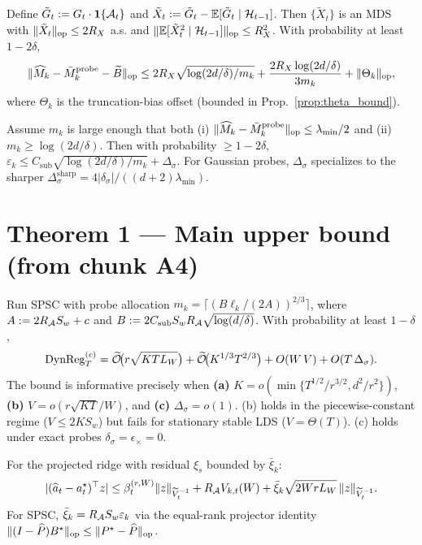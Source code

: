 \begin{theorem}
\label{thm:matrix_bernstein}
Define $\tilde G_t := G_t\cdot\mathbf 1\{\mathcal{A}_t\}$ and
$\tilde X_t := \tilde G_t - \mathbb{E}[\tilde G_t\mid\mathcal{H}_{t-1}]$.
Then $\{\tilde X_t\}$ is an MDS with $\|\tilde X_t\|_{\mathrm{op}}\le 2R_X$ a.s.
and $\|\mathbb{E}[\tilde X_t^2\mid\mathcal{H}_{t-1}]\|_{\mathrm{op}}\le R_X^2$. With probability
at least $1-2\delta$,
\[
\|\widehat M_k - \bar M_k^{\mathrm{probe}} - \widetilde B\|_{\mathrm{op}}
\le 2R_X\sqrt{\log(2d/\delta)/m_k} + \frac{2R_X\log(2d/\delta)}{3m_k}
+ \|\Theta_k\|_{\mathrm{op}},
\]
where $\Theta_k$ is the truncation-bias offset
(bounded in Prop.\ \ref{prop:theta_bound}).
\end{theorem}

\begin{corollary}
\label{cor:projector}
Assume $m_k$ is large enough that both (i)
$\|\widehat M_k - \bar M_k^{\mathrm{probe}}\|_{\mathrm{op}}\le\lambda_{\min}/2$
and (ii) $m_k\ge\log(2d/\delta)$. Then with probability $\ge 1-2\delta$,
$\varepsilon_k \le C_{\mathrm{sub}}\sqrt{\log(2d/\delta)/m_k} + \Delta_\sigma$.
For Gaussian probes, $\Delta_\sigma$ specializes to the sharper
$\Delta_\sigma^{\mathrm{sharp}} = 4|\delta_\sigma|/((d+2)\lambda_{\min})$.
\end{corollary}

\section{Theorem 1 --- Main upper bound (from chunk A4)}

\begin{theorem}
\label{thm:spsc_regret}
Run SPSC with probe allocation $m_k = \lceil (B\ell_k/(2A))^{2/3}\rceil$,
where $A := 2R_{\mathcal{A}} S_w + c$ and
$B := 2 C_{\mathrm{sub}} S_w R_{\mathcal{A}} \sqrt{\log(d/\delta)}$.
With probability at least $1-\delta$,
\[
\mathrm{DynReg}_T^{(c)}
= \widetilde{\mathcal{O}}\!\bigl(r\sqrt{K T L_W}\bigr)
+ \widetilde{\mathcal{O}}\!\bigl(K^{1/3}T^{2/3}\bigr)
+ O(W\,V)
+ O(T\,\Delta_\sigma).
\]
The bound is informative precisely when
\textbf{(a)} $K=o(\min\{T^{1/2}/r^{3/2},d^2/r^2\})$,
\textbf{(b)} $V=o(r\sqrt{KT}/W)$, and
\textbf{(c)} $\Delta_\sigma = o(1)$.
(b) holds in the piecewise-constant regime ($V\le 2KS_w$) but fails
for stationary stable LDS ($V=\Theta(T)$). (c) holds under exact
probes $\delta_\sigma=\epsilon_\times=0$.
\end{theorem}

\begin{lemma}
\label{lem:drift}
For the projected ridge with residual $\xi_s$ bounded by $\bar\xi_k$:
\[
|(\widehat a_t - a_t^\star)^\top z|
\le \beta_t^{(r,W)}\|z\|_{\widetilde V_t^{-1}}
+ R_{\mathcal{A}} V_{k,t}(W)
+ \bar\xi_k\sqrt{2W r L_W}\,\|z\|_{\widetilde V_t^{-1}}.
\]
For SPSC, $\bar\xi_k=R_{\mathcal{A}} S_w\varepsilon_k$ via the equal-rank
projector identity $\|(I-\widehat P)B^\star\|_{\mathrm{op}}\le\|P^\star-\widehat P\|_{\mathrm{op}}$.
\end{lemma}


